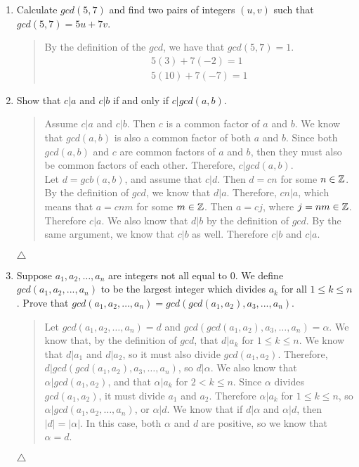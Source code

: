 \documentclass{hw}
\begin{document}

\begin{enumerate}
\item Calculate $gcd(5, 7)$ and find two pairs of integers $(u, v)$ such that $gcd(5, 7) = 5u + 7v$.
\begin{quote}
By the definition of the $gcd$, we have that $gcd(5,7) = 1$.
\begin{gather*}
5(3) + 7(-2) = 1\\
5(10) + 7(-7) = 1
\end{gather*}
\end{quote}

\item Show that $c|a$ and $c|b$ if and only if $c | gcd(a,b)$.
\begin{quote}

Assume $c|a$ and $c|b$. Then $c$ is a common factor of $a$ and $b$. We know that $gcd(a,b)$ is also
a common factor of both $a$ and $b$. Since both $gcd(a,b)$ and $c$ are common factors of $a$ and
$b$, then they must also be common factors of each other. Therefore, $c|gcd(a,b)$.\\

Let $d = gcb(a,b)$, and assume that $c|d$. Then $d = cn$ for some $n\in\mathbb{Z}$. By the definition of
$gcd$, we know that $d|a$. Therefore, $cn|a$, which means that $a = cnm$ for some $m\in\mathbb{Z}$. Then
$a = cj$, where $j = nm\in\mathbb{Z}$. Therefore $c|a$. We also know that $d|b$ by the definition of
$gcd$. By the same argument, we know that $c|b$ as well. Therefore $c|b$ and $c|a$.
\end{quote}
$\triangle$

\item Suppose $a_{1},a_{2},\dots,a_{n}$ are integers not all equal to 0. We define
$gcd(a_{1},a_{2},...,a_{n})$ to be the largest integer which divides $a_{k}$ for all $1 \leq k \leq
n$. Prove that $gcd(a_{1},a_{2},\dots,a_{n}) = gcd(gcd(a_{1},a_{2}),a_{3},...,a_{n})$.
\begin{quote}
Let $gcd(a_{1},a_{2},\dots,a_{n}) = d$ and $gcd(gcd(a_{1},a_{2}),a_{3},\dots,a_{n}) = \alpha$. We
know that, by the definition of $gcd$, that $d|a_{k}$ for $1 \leq k \leq n$. We know that $d|a_{1}$
and $d|a_{2}$, so it must also divide $gcd(a_{1},a_{2})$. Therefore, $d|gcd(gcd(a_{1},a_{2})
,a_{3},\dots,a_{n})$, so $d|\alpha$. We also know that $\alpha|gcd(a_{1},a_{2})$, and that
$\alpha|a_{k}$ for $2 < k \leq n$. Since $\alpha$ divides $gcd(a_{1},a_{2})$, it must divide
$a_{1}$ and $a_{2}$. Therefore $\alpha|a_{k}$ for $1 \leq k \leq n$, so
$\alpha|gcd(a_{1},a_{2},\dots,a_{n})$, or $\alpha|d$. We know that if $d|\alpha$ and
$\alpha|d$, then $|d| = |\alpha|$. In this case, both $\alpha$ and $d$ are positive,
so we know that $\alpha = d$.
\end{quote}
$\triangle$


\end{enumerate}
\end{document}
